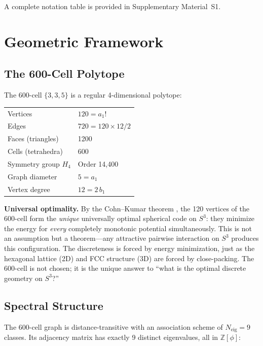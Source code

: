 \documentclass[12pt,a4paper]{article}
\theoremstyle{definition}
\begin{document}
A complete notation table is provided in Supplementary Material~S1.


\section{Geometric Framework}
\label{sec:geometry}

\subsection{The 600-Cell Polytope}

The 600-cell $\{3,3,5\}$ is a regular 4-dimensional polytope:

\begin{center}
\begin{tabular}{ll}
\toprule
Vertices & $120 = a_1!$ \\
Edges & $720 = 120 \times 12 / 2$ \\
Faces (triangles) & 1200 \\
Cells (tetrahedra) & 600 \\
Symmetry group $H_4$ & Order 14,400 \\
Graph diameter & $5 = a_1$ \\
Vertex degree & $12 = 2\,b_1$ \\
\bottomrule
\end{tabular}
\end{center}

\textbf{Universal optimality.} By the Cohn--Kumar theorem \cite{cohn2007,cohn2022}, the 120 vertices of the 600-cell form the \emph{unique} universally optimal spherical code on $S^3$: they minimize the energy for \emph{every} completely monotonic potential simultaneously. This is not an assumption but a theorem---any attractive pairwise interaction on $S^3$ produces this configuration. The discreteness is forced by energy minimization, just as the hexagonal lattice (2D) and FCC structure (3D) are forced by close-packing. The 600-cell is not chosen; it is the unique answer to ``what is the optimal discrete geometry on $S^3$?''

\subsection{Spectral Structure}

The 600-cell graph is distance-transitive with an association scheme of $N_{\text{eig}} = 9$ classes. Its adjacency matrix has exactly 9 distinct eigenvalues, all in $\mathbb{Z}[\phi]$:
\end{document}
